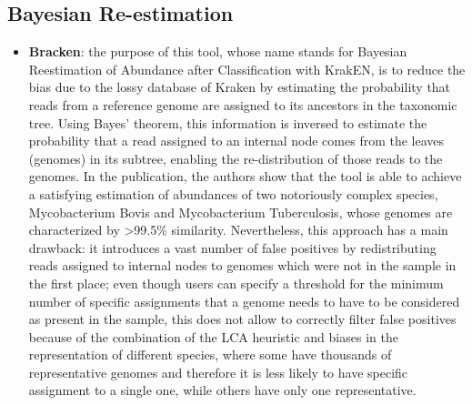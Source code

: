 \subsection{Bayesian Re-estimation}
\begin{itemize}
    \item \textbf{Bracken}: the purpose of this tool, whose name stands for Bayesian Reestimation of Abundance after Classification with KrakEN, is to reduce the bias due to the lossy database of Kraken by estimating the probability that reads from a reference genome are assigned to its ancestors in the taxonomic tree. Using Bayes' theorem, this information is inversed to estimate the probability that a read assigned to an internal node comes from the leaves (genomes) in its subtree, enabling the re-distribution of those reads to the genomes. In the publication, the authors show that the tool is able to achieve a satisfying estimation of abundances of two notoriously complex species, Mycobacterium Bovis and Mycobacterium Tuberculosis, whose genomes are characterized by >99.5\% similarity. Nevertheless, this approach has a main drawback: it introduces a vast number of false positives by redistributing reads assigned to internal nodes to genomes which were not in the sample in the first place; even though users can specify a threshold for the minimum number of specific assignments that a genome needs to have to be considered as present in the sample, this does not allow to correctly filter false positives because of the combination of the LCA heuristic and biases in the representation of different species, where some have thousands of representative genomes and therefore it is less likely to have specific assignment to a single one, while others have only one representative.
\end{itemize}

